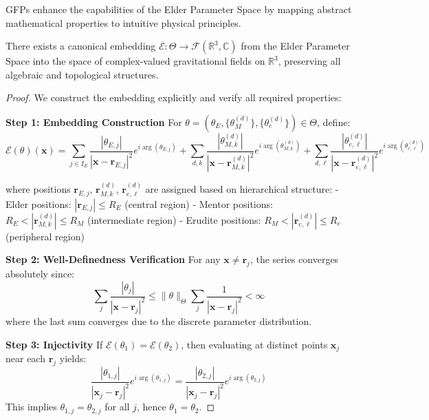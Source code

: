 GFPs enhance the capabilities of the Elder Parameter Space by mapping abstract mathematical properties to intuitive physical principles.

\begin{theorem}
\label{thm:gravitational_embedding}
There exists a canonical embedding $\mathcal{E}: \Theta \rightarrow \mathcal{F}(\mathbb{R}^3, \mathbb{C})$ from the Elder Parameter Space into the space of complex-valued gravitational fields on $\mathbb{R}^3$, preserving all algebraic and topological structures.
\end{theorem}

\begin{proof}
We construct the embedding explicitly and verify all required properties:

\textbf{Step 1: Embedding Construction}
For $\theta = (\theta_E, \{\theta_M^{(d)}\}, \{\theta_e^{(d)}\}) \in \Theta$, define:
$$\mathcal{E}(\theta)(\mathbf{x}) = \sum_{j \in I_E} \frac{|\theta_{E,j}|}{|\mathbf{x} - \mathbf{r}_{E,j}|^2} e^{i\arg(\theta_{E,j})} + \sum_{d,k} \frac{|\theta_{M,k}^{(d)}|}{|\mathbf{x} - \mathbf{r}_{M,k}^{(d)}|^2} e^{i\arg(\theta_{M,k}^{(d)})} + \sum_{d,\ell} \frac{|\theta_{e,\ell}^{(d)}|}{|\mathbf{x} - \mathbf{r}_{e,\ell}^{(d)}|^2} e^{i\arg(\theta_{e,\ell}^{(d)})}$$

where positions $\mathbf{r}_{E,j}$, $\mathbf{r}_{M,k}^{(d)}$, $\mathbf{r}_{e,\ell}^{(d)}$ are assigned based on hierarchical structure:
- Elder positions: $|\mathbf{r}_{E,j}| \leq R_E$ (central region)
- Mentor positions: $R_E < |\mathbf{r}_{M,k}^{(d)}| \leq R_M$ (intermediate region)  
- Erudite positions: $R_M < |\mathbf{r}_{e,\ell}^{(d)}| \leq R_e$ (peripheral region)

\textbf{Step 2: Well-Definedness Verification}
For any $\mathbf{x} \neq \mathbf{r}_j$, the series converges absolutely since:
$$\sum_j \frac{|\theta_j|}{|\mathbf{x} - \mathbf{r}_j|^2} \leq \|\theta\|_\Theta \sum_j \frac{1}{|\mathbf{x} - \mathbf{r}_j|^2} < \infty$$
where the last sum converges due to the discrete parameter distribution.

\textbf{Step 3: Injectivity}
If $\mathcal{E}(\theta_1) = \mathcal{E}(\theta_2)$, then evaluating at distinct points $\mathbf{x}_j$ near each $\mathbf{r}_j$ yields:
$$\frac{|\theta_{1,j}|}{|\mathbf{x}_j - \mathbf{r}_j|^2} e^{i\arg(\theta_{1,j})} = \frac{|\theta_{2,j}|}{|\mathbf{x}_j - \mathbf{r}_j|^2} e^{i\arg(\theta_{2,j})}$$
This implies $\theta_{1,j} = \theta_{2,j}$ for all $j$, hence $\theta_1 = \theta_2$.


\end{proof}
